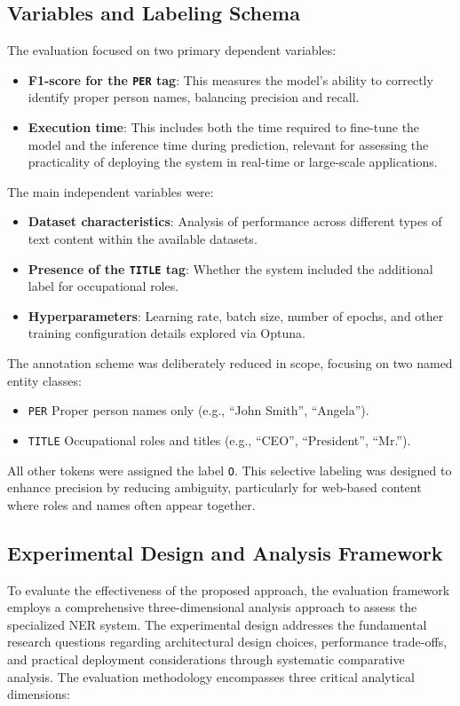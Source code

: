 \documentclass[a4paper]{usiinfbachelorproject}
\begin{document}
\subsection{Variables and Labeling Schema}

The evaluation focused on two primary dependent variables:

\begin{itemize}
  \item \textbf{F1-score for the \texttt{PER} tag}: This measures the model’s ability to correctly identify proper person names, balancing precision and recall.  \item \textbf{Execution time}: This includes both the time required to fine-tune the model and the inference time during prediction, relevant for assessing the practicality of deploying the system in real-time or large-scale applications.
\end{itemize}

The main independent variables were:

\begin{itemize}
  \item \textbf{Dataset characteristics}: Analysis of performance across different types of text content within the available datasets.
  \item \textbf{Presence of the \texttt{TITLE} tag}: Whether the system included the additional label for occupational roles.
  \item \textbf{Hyperparameters}: Learning rate, batch size, number of epochs, and other training configuration details explored via Optuna.
\end{itemize}

The annotation scheme was deliberately reduced in scope, focusing on two named entity classes:

\begin{itemize}
  \item \texttt{PER}   Proper person names only (e.g., “John Smith”, “Angela”).
  \item \texttt{TITLE}   Occupational roles and titles (e.g., “CEO”, “President”, “Mr.”).
\end{itemize}

All other tokens were assigned the label \texttt{O}. This selective labeling was designed to enhance precision by reducing ambiguity, particularly for web-based content where roles and names often appear together.

\subsection{Experimental Design and Analysis Framework}
To evaluate the effectiveness of the proposed approach, the evaluation framework employs a comprehensive three-dimensional analysis approach to assess the specialized NER system. The experimental design addresses the fundamental research questions regarding architectural design choices, performance trade-offs, and practical deployment considerations through systematic comparative analysis. The evaluation methodology encompasses three critical analytical dimensions:
\end{document}
